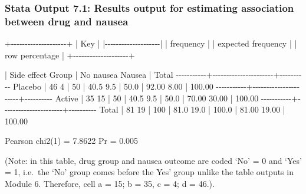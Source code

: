 \documentclass[
]{memoir}
\newenvironment{Shaded}{\begin{snugshade}}{\end{snugshade}}
\newcommand{\NormalTok}[1]{#1}
\begin{document}
\hypertarget{stata-output-7.1-results-output-for-estimating-association-between-drug-and-nausea}{%
\subsubsection*{Stata Output 7.1: Results output for estimating association between drug and nausea}\label{stata-output-7.1-results-output-for-estimating-association-between-drug-and-nausea}}

\begin{Shaded}
\begin{Highlighting}[]
\NormalTok{+{-}{-}{-}{-}{-}{-}{-}{-}{-}{-}{-}{-}{-}{-}{-}{-}{-}{-}{-}{-}+}
\NormalTok{| Key                |}
\NormalTok{|{-}{-}{-}{-}{-}{-}{-}{-}{-}{-}{-}{-}{-}{-}{-}{-}{-}{-}{-}{-}|}
\NormalTok{|     frequency      |}
\NormalTok{| expected frequency |}
\NormalTok{|   row percentage   |}
\NormalTok{+{-}{-}{-}{-}{-}{-}{-}{-}{-}{-}{-}{-}{-}{-}{-}{-}{-}{-}{-}{-}+}

\NormalTok{           |      Side effect}
\NormalTok{     Group | No nausea     Nausea |     Total}
\NormalTok{{-}{-}{-}{-}{-}{-}{-}{-}{-}{-}{-}+{-}{-}{-}{-}{-}{-}{-}{-}{-}{-}{-}{-}{-}{-}{-}{-}{-}{-}{-}{-}{-}{-}+{-}{-}{-}{-}{-}{-}{-}{-}{-}{-}}
\NormalTok{   Placebo |        46          4 |        50 }
\NormalTok{           |      40.5        9.5 |      50.0 }
\NormalTok{           |     92.00       8.00 |    100.00 }
\NormalTok{{-}{-}{-}{-}{-}{-}{-}{-}{-}{-}{-}+{-}{-}{-}{-}{-}{-}{-}{-}{-}{-}{-}{-}{-}{-}{-}{-}{-}{-}{-}{-}{-}{-}+{-}{-}{-}{-}{-}{-}{-}{-}{-}{-}}
\NormalTok{    Active |        35         15 |        50 }
\NormalTok{           |      40.5        9.5 |      50.0 }
\NormalTok{           |     70.00      30.00 |    100.00 }
\NormalTok{{-}{-}{-}{-}{-}{-}{-}{-}{-}{-}{-}+{-}{-}{-}{-}{-}{-}{-}{-}{-}{-}{-}{-}{-}{-}{-}{-}{-}{-}{-}{-}{-}{-}+{-}{-}{-}{-}{-}{-}{-}{-}{-}{-}}
\NormalTok{     Total |        81         19 |       100 }
\NormalTok{           |      81.0       19.0 |     100.0 }
\NormalTok{           |     81.00      19.00 |    100.00 }

\NormalTok{          Pearson chi2(1) =   7.8622   Pr = 0.005}
\end{Highlighting}
\end{Shaded}

(Note: in this table, drug group and nausea outcome are coded `No' = 0 and `Yes' = 1, i.e.~the `No' group comes before the Yes' group unlike the table outputs in Module 6. Therefore, cell a = 15; b = 35, c = 4; d = 46.).
\end{document}
